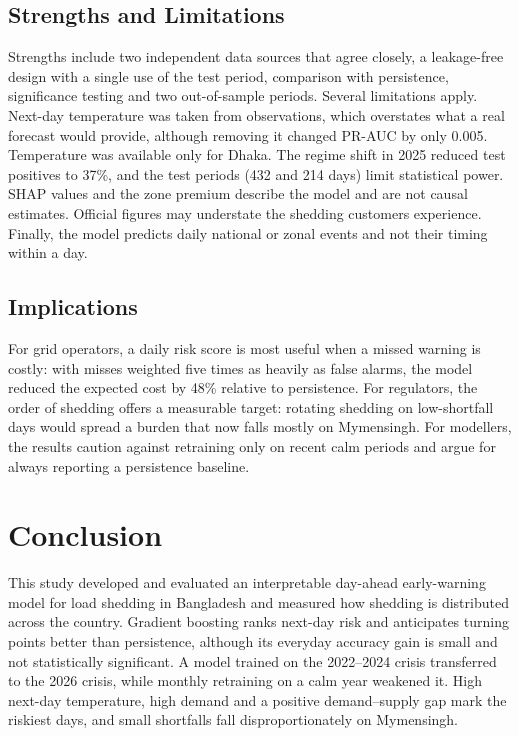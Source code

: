 \documentclass[conference]{IEEEtran}
\begin{document}
\subsection{Strengths and Limitations}
Strengths include two independent data sources that agree closely, a leakage-free design with a single use of the test period, comparison with persistence, significance testing and two out-of-sample periods. Several limitations apply. Next-day temperature was taken from observations, which overstates what a real forecast would provide, although removing it changed PR-AUC by only 0.005. Temperature was available only for Dhaka. The regime shift in 2025 reduced test positives to 37\%, and the test periods (432 and 214 days) limit statistical power. SHAP values and the zone premium describe the model and are not causal estimates. Official figures may understate the shedding customers experience. Finally, the model predicts daily national or zonal events and not their timing within a day.

\subsection{Implications}
For grid operators, a daily risk score is most useful when a missed warning is costly: with misses weighted five times as heavily as false alarms, the model reduced the expected cost by 48\% relative to persistence. For regulators, the order of shedding offers a measurable target: rotating shedding on low-shortfall days would spread a burden that now falls mostly on Mymensingh. For modellers, the results caution against retraining only on recent calm periods and argue for always reporting a persistence baseline.

\section{Conclusion}\label{sec:conclusion}
This study developed and evaluated an interpretable day-ahead early-warning model for load shedding in Bangladesh and measured how shedding is distributed across the country. Gradient boosting ranks next-day risk and anticipates turning points better than persistence, although its everyday accuracy gain is small and not statistically significant. A model trained on the 2022--2024 crisis transferred to the 2026 crisis, while monthly retraining on a calm year weakened it. High next-day temperature, high demand and a positive demand--supply gap mark the riskiest days, and small shortfalls fall disproportionately on Mymensingh.
\end{document}
